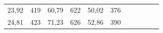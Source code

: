 \documentclass[a4paper,12pt]{article} %
\begin{document}
\begin{table}[]
\begin{tabular}{|rr|rr|rr|lrrll}
\multicolumn{1}{|r|}{23,92}         & 419                                  & \multicolumn{1}{r|}{60,79}         & 622                                  & \multicolumn{1}{r|}{50,02}         & 376                                  &                       & \multicolumn{1}{l}{}               & \multicolumn{1}{l}{}                 &                                    &                                      \\ \cline{1-6}
\multicolumn{1}{|r|}{24,81}         & 423                                  & \multicolumn{1}{r|}{71,23}         & 626                                  & \multicolumn{1}{r|}{52,86}         & 390                                  &                       & \multicolumn{1}{l}{}               & \multicolumn{1}{l}{}                 &                                    &                                      \\ \cline{1-6}
\end{tabular}
\end{table}
\end{document}
